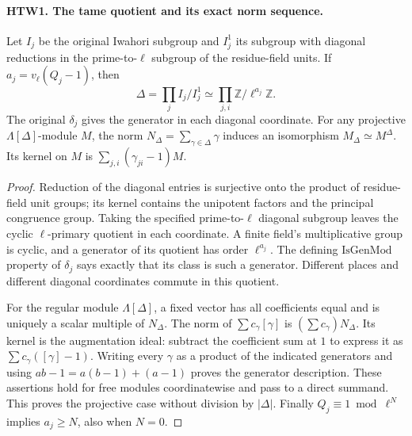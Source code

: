 \documentclass[11pt,a4paper]{article}
\numberwithin{equation}{section}
\theoremstyle{remark}\newtheorem{remark}[theorem]{Remark}
\begin{document}
\paragraph{HTW1. The tame quotient and its exact norm sequence.}
\label{claim:HTW1}
Let \(I_j\) be the original Iwahori subgroup and \(I_j^1\)
its subgroup with diagonal reductions in the prime-to-\(\ell\)
subgroup of the residue-field units.  If
\(a_j=v_\ell(Q_j-1)\), then
\[
 \Delta=\prod_j I_j/I_j^1
       \simeq\prod_{j,i}\mathbb Z/\ell^{a_j}\mathbb Z .
 \tag{HTW.4}
\]
The original \(\delta_j\) gives the generator in each diagonal
coordinate.  For any projective \(\Lambda[\Delta]\)-module \(M\),
the norm \(N_\Delta=\sum_{\gamma\in\Delta}\gamma\) induces
an isomorphism \(M_\Delta\simeq M^\Delta\).  Its kernel on \(M\)
is \(\sum_{j,i}(\gamma_{ji}-1)M\).
\begin{proof}
Reduction of the diagonal entries is surjective onto the
product of residue-field unit groups; its kernel contains the
unipotent factors and the principal congruence group.  Taking
the specified prime-to-\(\ell\) diagonal subgroup leaves the
cyclic \(\ell\)-primary quotient in each coordinate.  A finite
field's multiplicative group is cyclic, and a generator of
its quotient has order \(\ell^{a_j}\).  The defining
\(\mathrm{IsGenMod}\) property of \(\delta_j\) says exactly
that its class is such a generator.  Different places and
different diagonal coordinates commute in this quotient.

For the regular module \(\Lambda[\Delta]\), a fixed vector
has all coefficients equal and is uniquely a scalar multiple
of \(N_\Delta\).  The norm of \(\sum c_\gamma[\gamma]\)
is \((\sum c_\gamma)N_\Delta\).  Its kernel is the
augmentation ideal: subtract the coefficient sum at \(1\)
to express it as \(\sum c_\gamma([\gamma]-1)\).
Writing every \(\gamma\) as a product of the indicated
generators and using \(ab-1=a(b-1)+(a-1)\) proves the
generator description.  These assertions hold for free
modules coordinatewise and pass to a direct summand.
This proves the projective case without division by
\(|\Delta|\).  Finally \(Q_j\equiv1\bmod\ell^N\) implies
\(a_j\ge N\), also when \(N=0\).
\end{proof}

\end{document}
